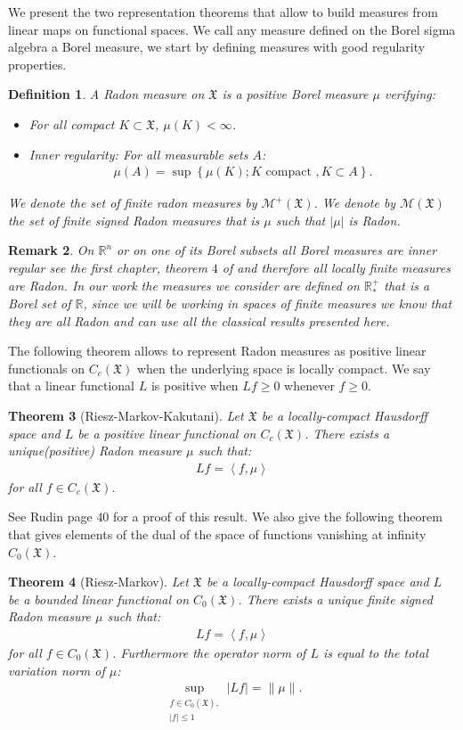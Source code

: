 \documentclass[11pt,a4paper]{article}
\newcommand{\RR}{\mathbb{R}}
\newcommand{\RRP}{\mathbb{R}^+_*}
\newcommand{\MC}{\mathcal{M}}
\newcommand{\XF}{\mathfrak{X}}
\newcommand{\brac}[1]{\left\langle#1\right\rangle}
\newtheorem{theorem}{Theorem}[section]
\newtheorem{remark}[theorem]{Remark}
\newtheorem{definition}[theorem]{Definition}
\begin{document}
We present the two representation theorems that allow to build measures from linear maps on functional spaces. We call any measure defined on the Borel sigma algebra a Borel measure, we start by defining measures with good regularity properties.
\begin{definition}
    A Radon measure on $\XF$ is a positive Borel measure $\mu$ verifying:
    \begin{itemize}
        \item For all compact $K\subset \XF$, $\mu(K) < \infty$.
        \item Inner regularity: For all measurable sets $A$:
        \begin{align*}
            \mu(A) = \sup{\left\lbrace \mu(K) ; K \text{ compact }, K \subset A\right\rbrace}.
        \end{align*}
    \end{itemize}
    We denote the set of finite radon measures by $\MC^+(\XF)$. We denote by $\MC(\XF)$ the set of finite signed Radon measures that is $\mu$ such that $|\mu|$ is Radon.
\end{definition}
\begin{remark}
    On $\RR^n$ or on one of its Borel subsets all Borel measures are inner regular see the first chapter, theorem $4$ of \cite{evans2018measure} and therefore all locally finite measures are Radon. In our work the measures we consider are defined on $\RRP$ that is a Borel set of $\RR$, since we will be working in spaces of finite measures we know that they are all Radon and can use all the classical results presented here. 
\end{remark}
 The following theorem allows to represent Radon measures as positive linear functionals on $C_c(\XF)$ when the underlying space is locally compact. We say that a linear functional $L$ is positive when $Lf \geq 0$ whenever $f \geq 0$.
\begin{theorem}[Riesz-Markov-Kakutani]
    Let $\XF$ be a locally-compact Hausdorff space and $L$ be a positive linear functional on $C_c(\XF)$. There exists a unique(positive) Radon measure $\mu$ such that:
    \begin{align*}
        Lf = \brac{f,\mu}
    \end{align*}
    for all $f \in C_c(\XF)$.
\end{theorem}
See Rudin \cite{rudin1987real} page $40$ for a proof of this result. We also give the following theorem that gives elements of the dual of the space of functions vanishing at infinity $C_0(\XF)$.
\begin{theorem}[Riesz-Markov]
    Let $\XF$ be a locally-compact Hausdorff space and $L$ be a bounded linear functional on $C_0(\XF)$. There exists a unique finite signed Radon measure $\mu$ such that:
    \begin{align*}
        Lf = \brac{f,\mu}
    \end{align*}
    for all $f \in C_0(\XF)$. Furthermore the operator norm of $L$ is equal to the total variation norm of $\mu$:
    \begin{align*}
        \sup\limits_{\substack{f\in C_0(\XF) ,\\ |f| \leq 1}} |Lf| = \|\mu\|.
    \end{align*}
\end{theorem}
\end{document}
